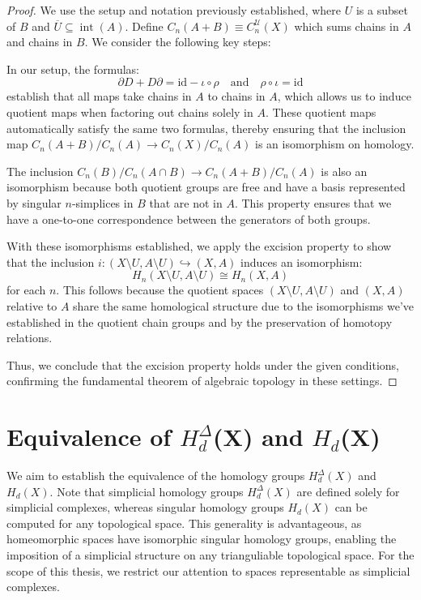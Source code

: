 \begin{proof}
We use the setup and notation previously established, where \( U \) is a subset of \( B \) and \( \overline{U} \subseteq \operatorname{int}(A) \). Define \( C_n(A + B) \equiv C^{\mathcal{U}}_n(X) \) which sums chains in \( A \) and chains in \( B \). We consider the following key steps:

In our setup, the formulas:
\[
\partial D + D \partial = \text{id} - \iota \circ \rho \quad \text{and} \quad \rho \circ \iota = \text{id}
\]
establish that all maps take chains in \( A \) to chains in \( A \), which allows us to induce quotient maps when factoring out chains solely in \( A \). These quotient maps automatically satisfy the same two formulas, thereby ensuring that the inclusion map \( C_n(A + B)/C_n(A) \to C_n(X)/C_n(A) \) is an isomorphism on homology.

The inclusion \( C_n(B)/C_n(A \cap B) \to C_n(A + B)/C_n(A) \) is also an isomorphism because both quotient groups are free and have a basis represented by singular \( n \)-simplices in \( B \) that are not in \( A \). This property ensures that we have a one-to-one correspondence between the generators of both groups.

With these isomorphisms established, we apply the excision property to show that the inclusion \( i: (X \setminus U, A \setminus U) \hookrightarrow (X, A) \) induces an isomorphism:
\[
H_n(X \setminus U, A \setminus U) \cong H_n(X, A)
\]
for each \( n \). This follows because the quotient spaces \( (X \setminus U, A \setminus U) \) and \( (X, A) \) relative to \( A \) share the same homological structure due to the isomorphisms we've established in the quotient chain groups and by the preservation of homotopy relations.

Thus, we conclude that the excision property holds under the given conditions, confirming the fundamental theorem of algebraic topology in these settings.
\end{proof}

\section{Equivalence of $H_{d}^{\Delta}$(X) and $H_{d}$(X)}
We aim to establish the equivalence of the homology groups $H^{\Delta}_{d}(X)$
and $H_{d}(X)$. Note that simplicial homology groups $H^{\Delta}_{d}(X)$ are defined
solely for simplicial complexes, whereas singular homology groups $H_{d}(X)$ can
be computed for any topological space. This generality is advantageous, as
homeomorphic spaces have isomorphic singular homology groups, enabling the imposition
of a simplicial structure on any trianguliable topological space. For the scope
of this thesis, we restrict our attention to spaces representable as simplicial complexes.

